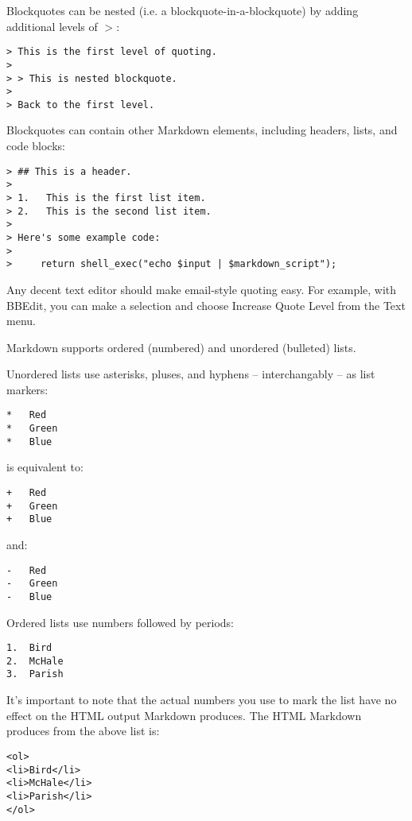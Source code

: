 Blockquotes can be nested (i.e. a blockquote-in-a-blockquote) by
adding additional levels of \texttt{$>$}:

\begin{verbatim}
> This is the first level of quoting.
>
> > This is nested blockquote.
>
> Back to the first level.
\end{verbatim}

Blockquotes can contain other Markdown elements, including headers, lists,
and code blocks:

\begin{verbatim}
> ## This is a header.
> 
> 1.   This is the first list item.
> 2.   This is the second list item.
> 
> Here's some example code:
> 
>     return shell_exec("echo $input | $markdown_script");
\end{verbatim}

Any decent text editor should make email-style quoting easy. For
example, with BBEdit, you can make a selection and choose Increase
Quote Level from the Text menu.

Markdown supports ordered (numbered) and unordered (bulleted) lists.

Unordered lists use asterisks, pluses, and hyphens -- interchangably
-- as list markers:

\begin{verbatim}
*   Red
*   Green
*   Blue
\end{verbatim}

is equivalent to:

\begin{verbatim}
+   Red
+   Green
+   Blue
\end{verbatim}

and:

\begin{verbatim}
-   Red
-   Green
-   Blue
\end{verbatim}

Ordered lists use numbers followed by periods:

\begin{verbatim}
1.  Bird
2.  McHale
3.  Parish
\end{verbatim}

It's important to note that the actual numbers you use to mark the
list have no effect on the HTML output Markdown produces. The HTML
Markdown produces from the above list is:

\begin{verbatim}
<ol>
<li>Bird</li>
<li>McHale</li>
<li>Parish</li>
</ol>
\end{verbatim}

